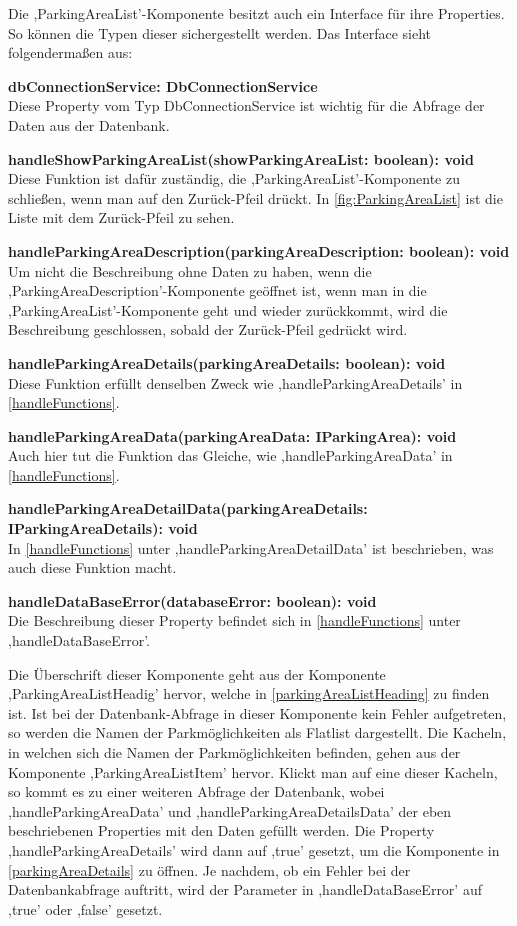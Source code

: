 Die ,ParkingAreaList'-Komponente besitzt auch ein Interface für ihre Properties. So können die Typen dieser sichergestellt werden. Das Interface sieht folgendermaßen aus:
\begin{description}
	\item \textbf{dbConnectionService: DbConnectionService} \\ Diese Property vom Typ DbConnectionService ist wichtig für die Abfrage der Daten aus der Datenbank.
	\item \textbf{handleShowParkingAreaList(showParkingAreaList: boolean): void} \\ Diese Funktion ist dafür zuständig, die ,ParkingAreaList'-Komponente zu schließen, wenn man auf den Zurück-Pfeil drückt. In \autoref{fig:ParkingAreaList} ist die Liste mit dem Zurück-Pfeil zu sehen.
	\item \textbf{handleParkingAreaDescription(parkingAreaDescription: boolean): void} \\ Um nicht die Beschreibung ohne Daten zu haben, wenn die ,ParkingAreaDescription'-Komponente geöffnet ist, wenn man in die ,ParkingAreaList'-Komponente geht und wieder zurückkommt, wird die Beschreibung geschlossen, sobald der Zurück-Pfeil gedrückt wird.
	\item \textbf{handleParkingAreaDetails(parkingAreaDetails: boolean): void} \\ Diese Funktion erfüllt denselben Zweck wie ,handleParkingAreaDetails' in \autoref{handleFunctions}.
	\item \textbf{handleParkingAreaData(parkingAreaData: IParkingArea): void} \\ Auch hier tut die Funktion das Gleiche, wie ,handleParkingAreaData' in \autoref{handleFunctions}.
	\item \textbf{handleParkingAreaDetailData(parkingAreaDetails: IParkingAreaDetails): void} \\ In \autoref{handleFunctions} unter ,handleParkingAreaDetailData' ist beschrieben, was auch diese Funktion macht.
	\item \textbf{handleDataBaseError(databaseError: boolean): void} \\ Die Beschreibung dieser Property befindet sich in \autoref{handleFunctions} unter ,handleDataBaseError'.
\end{description} 

Die Überschrift dieser Komponente geht aus der Komponente ,ParkingAreaListHeadig' hervor, welche in \autoref{parkingAreaListHeading} zu finden ist. Ist bei der Datenbank-Abfrage in dieser Komponente kein Fehler aufgetreten, so werden die Namen der Parkmöglichkeiten als Flatlist dargestellt. Die Kacheln, in welchen sich die Namen der Parkmöglichkeiten befinden, gehen aus der Komponente ,ParkingAreaListItem' hervor. Klickt man auf eine dieser Kacheln, so kommt es zu einer weiteren Abfrage der Datenbank, wobei ,handleParkingAreaData' und ,handleParkingAreaDetailsData' der eben beschriebenen Properties mit den Daten gefüllt werden. Die Property ,handleParkingAreaDetails' wird dann auf ,true' gesetzt, um die Komponente in \autoref{parkingAreaDetails} zu öffnen. Je nachdem, ob ein Fehler bei der Datenbankabfrage auftritt, wird der Parameter in ,handleDataBaseError' auf ,true' oder ,false' gesetzt.

